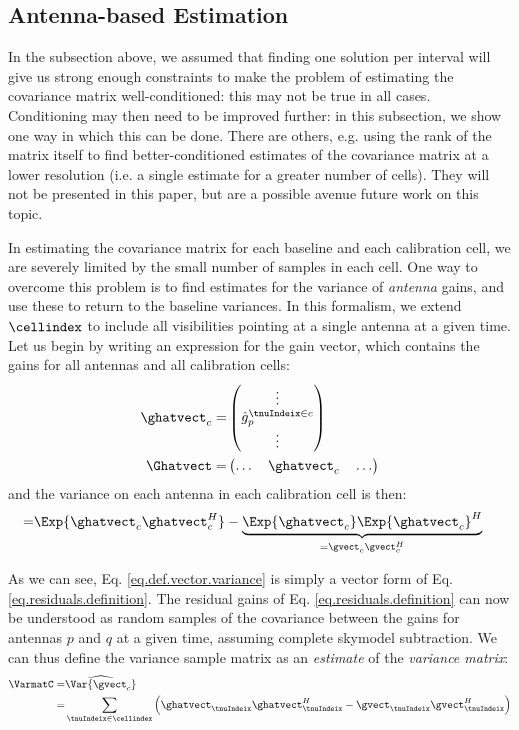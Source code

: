 \subsection{Antenna-based Estimation}

In the subsection above, we assume{d} that finding one solution per interval will give us strong enough constraints to make the problem {of estimating the covariance matrix} well-conditioned: this may not be true in all cases. Conditioning may then need to be improved further: in this subsection, we show one way in which this can be done. There are others, e.g. using the rank of the matrix itself to find better-conditioned estimates of the covariance matrix at a lower resolution (i.e. a single estimate for a greater number of cells). They will not be presented in this paper, but are a possible avenue future work on this topic.

\pg
In estimating the covariance matrix for each baseline and each calibration cell, we are severely limited by the small number of samples in each cell. One way to overcome this problem is to find estimates for the variance of \emph{antenna} gains, and use these to return to the baseline variances. In this formalism, we extend  $\cellindex$ to include all visibilities pointing at a single antenna at a given time. Let us begin by writing an expression for the gain vector, which contains the gains for all antennas and all calibration cells:
\begin{align}
\ghatvect_c =& \begin{pmatrix} \vdots \\ \hat{g}_p^{\tnuIndeix\in c} \\ \vdots \end{pmatrix}\\
\Ghatvect =& \begin{pmatrix} \hdots \quad \ghatvect_c \quad \hdots \end{pmatrix}
\end{align}
and the variance on each antenna in each calibration cell is then:
\begin{align}
               =& \Exp{\ghatvect_c \ghatvect_c^H} - \underbrace{\Exp{\ghatvect_c} \Exp{\ghatvect_c}^H}_{= \gvect_c \gvect_c^H} \label{eq.def.vector.variance}
\end{align}

\pg
As we can see, Eq. \ref{eq.def.vector.variance} is simply a vector form of Eq. \ref{eq.residuals.definition}.
The residual gains of Eq. \ref{eq.residuals.definition} can now be understood as random samples of the covariance between the gains for antennas $p$ and $q$ at a given time, assuming complete skymodel subtraction. We can thus define the variance sample matrix as an \emph{estimate} of the \emph{variance matrix}:
\begin{align}
\VarmatC =&\widehat{\Var{\gvect_c}} \\
                   =& \sum_{\tnuIndeix\in\cellindex} \left( \ghatvect_\tnuIndeix\ghatvect_\tnuIndeix^H - \gvect_\tnuIndeix\gvect_\tnuIndeix^H \right)
\end{align}


